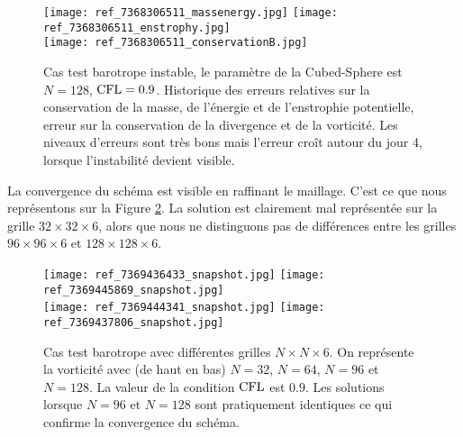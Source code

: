 \begin{figure}[htbp]
\begin{center}
\texttt{[image: ref\_7368306511\_massenergy.jpg]}
\texttt{[image: ref\_7368306511\_enstrophy.jpg]}\\
\texttt{[image: ref\_7368306511\_conservationB.jpg]}
\end{center}
\caption{Cas test barotrope instable, le paramètre de la Cubed-Sphere est $N=128$, $\text{CFL}=0.9$. Historique des erreurs relatives sur la conservation de la masse, de l'énergie et de l'enstrophie potentielle, erreur sur la conservation de la divergence et de la vorticité. Les niveaux d'erreurs sont très bons mais l'erreur croît autour du jour 4, lorsque l'instabilité devient visible.}
\label{fig: galewsky conservation}
\end{figure}

La convergence du schéma est visible en raffinant le maillage. C'est ce que nous représentons sur la Figure \ref{fig: galewsky convergence}. La solution est clairement mal représentée sur la grille $32 \times 32 \times 6$, alors que nous ne distinguons pas de différences entre les grilles $96 \times 96\times 6$ et $128 \times 128\times 6$.

\begin{figure}[htbp]
\begin{center}
\texttt{[image: ref\_7369436433\_snapshot.jpg]}
\texttt{[image: ref\_7369445869\_snapshot.jpg]}\\
\texttt{[image: ref\_7369444341\_snapshot.jpg]}
\texttt{[image: ref\_7369437806\_snapshot.jpg]}
\end{center}
\caption{Cas test barotrope avec différentes grilles $N \times N \times 6$. On représente la vorticité avec (de haut en bas) $N=32$, $N=64$, $N=96$ et $N=128$. La valeur de la condition $\text{CFL}$ est $0.9$. Les solutions lorsque $N=96$ et $N=128$ sont pratiquement identiques ce qui confirme la convergence du schéma.}
\label{fig: galewsky convergence}
\end{figure}



























